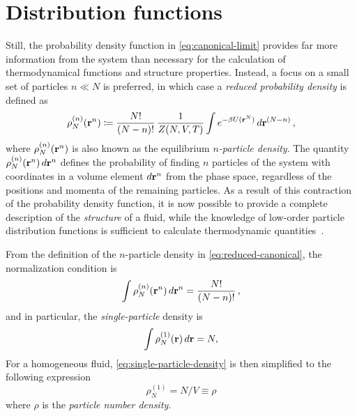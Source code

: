 \section{Distribution functions}

Still, the probability density function in \autoref{eq:canonical-limit} provides far more
information from the system than necessary for the calculation of thermodynamical functions
and structure properties. Instead, a focus on a small set of particles $n \ll N$ is 
preferred, in which case a \emph{reduced probability density} is defined as
\begin{equation}
    \rho^{(n)}_{N} (\mathbf{r}^{n}) \coloneqq \frac{N!}{(N-n)!} \, \frac{1}{Z(N,V,T)}
    \int e^{- \beta U(\mathbf{r}^{N})} \, d \mathbf{r}^{(N-n)} \, ,
    \label{eq:reduced-canonical}
\end{equation}
where $\rho^{(n)}_{N} (\mathbf{r}^{n})$ is also known as the equilibrium 
$n$\emph{-particle density}.
The quantity $\rho^{(n)}_{N} (\mathbf{r}^{n}) \, d \mathbf{r}^{n}$ defines the probability of finding
$n$ particles of the system with coordinates in a volume element $d \mathbf{r}^{n}$ from the
phase space, regardless of the positions and momenta of the remaining particles.
As a result of this contraction of the probability density function, it is now possible to
provide a complete description of the \emph{structure} of a fluid, while the knowledge
of low-order particle distribution functions is sufficient to calculate thermodynamic
quantities~\cite{mcquarrieStatisticalMechanics2000}.

From the definition of the $n$-particle density in \autoref{eq:reduced-canonical}, the
normalization condition is
\begin{equation}
    \int \rho^{(n)}_{N} (\mathbf{r}^{n}) \, d \mathbf{r}^{n} = \frac{N!}{(N-n)!} \, ,
    \label{eq:normalization-reduced}
\end{equation}
and in particular, the \emph{single-particle} density is
\begin{equation}
    \int \rho^{(1)}_{N} (\mathbf{r}) \, d \mathbf{r} = N ,
    \label{eq:single-particle-density}
\end{equation}
For a homogeneous fluid, \autoref{eq:single-particle-density} is then simplified
to the following expression
\begin{equation}
    \rho^{(1)}_{N} = N / V \equiv \rho
    \label{eq:homogeneous-density}
\end{equation}
where $\rho$ is the \emph{particle number density}.

